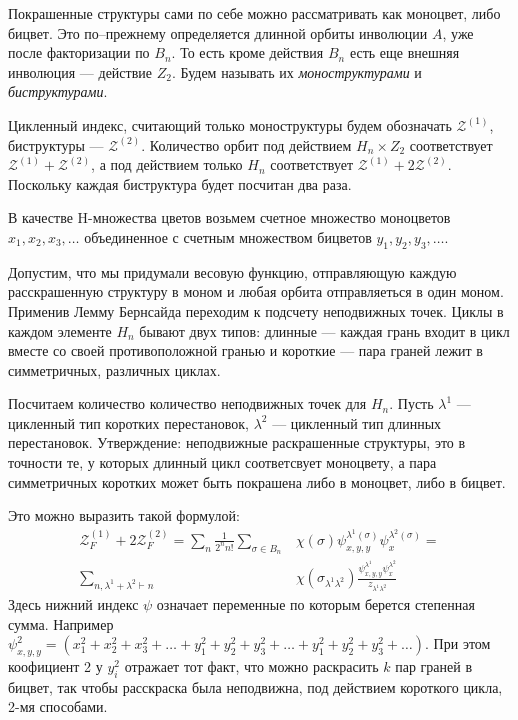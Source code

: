 Покрашенные структуры сами по себе можно рассматривать как моноцвет, либо
бицвет. Это по--прежнему определяется длинной орбиты инволюции $A$, уже
после факторизации по $B_n$. То есть кроме действия $B_n$ есть еще внешняя
инволюция --- действие $Z_2$. Будем называть их \emph{моноструктурами} и
\emph{биструктурами}.

Цикленный индекс, считающий только моноструктуры будем обозначать
$\mathcal Z^{(1)}$, биструктуры --- $\mathcal Z^{(2)}$. Количество орбит под
действием $H_n \times Z_2$ соответствует $\mathcal Z^{(1)} + \mathcal Z^{(2)}$,
а под действием только $H_n$ соответствует $\mathcal Z^{(1)} + 2\mathcal
Z^{(2)}$. Поскольку каждая биструктура будет посчитан два раза.

В качестве H-множества цветов возьмем счетное множество моноцветов $x_1, x_2,
x_3, \dots$ объединенное с счетным множеством бицветов $y_1, y_2, y_3, \dots$.

Допустим, что мы придумали весовую функцию, отправляющую каждую расскрашенную
структуру в моном и любая орбита отправляеться в один моном. Применив Лемму
Бернсайда переходим к подсчету неподвижных точек. Циклы в каждом элементе $H_n$
бывают двух типов:
длинные --- каждая грань входит в цикл вместе со своей противоположной гранью и
короткие --- пара граней лежит в симметричных, различных циклах. 

Посчитаем количество количество неподвижных точек для $H_n$. Пусть $\lambda^1$
--- цикленный тип коротких перестановок, $\lambda^2$ --- цикленный тип длинных
перестановок. Утверждение: неподвижные раскрашенные структуры, это в точности
те, у которых длинный цикл соответсвует моноцвету, а пара симметричных коротких 
может быть покрашена либо в моноцвет, либо в бицвет.

Это можно выразить такой формулой:
\begin{equation}
\label{eq:h-fr1}
\begin{split}
\mathcal Z_F^{(1)} + 2\mathcal Z_F^{(2)} = 
\sum_{n}\frac{1}{2^{n}n!}\sum_{\sigma \in B_n}&\chi(\sigma)
\psi_{x, y, y}^{\lambda^1(\sigma)} \psi_{x}^{\lambda^2(\sigma)} = \\
\sum_{n, \lambda^1 + \lambda^2 \vdash n}&\chi(\sigma_{\lambda^1 \lambda^2})
\frac{\psi_{x, y, y}^{\lambda^1} \psi_{x}^{\lambda^2}}{z_{\lambda^1 \lambda^2}}
\end{split}
\end{equation}
Здесь нижний индекс $\psi$ означает переменные по которым берется степенная
сумма. Например $\psi_{x, y, y}^2 =  (x_1^2 + x_2^2 + x_3^2 + \dots + y_1^2 +
y_2^2 + y_3^2 + \dots + y_1^2 + y_2^2 + y_3^2 + \dots)$. При этом коофициент
2 у $y_i^2$ отражает тот факт, что можно раскрасить $k$ пар граней в бицвет,
так чтобы расскраска была неподвижна, под действием короткого цикла, 2-мя способами.

